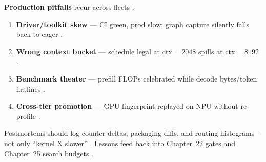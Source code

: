 \textbf{Production pitfalls} recur across fleets \citep{patel2025llminference,memoryfloor2026,taxbreak2026,yirage2026,chen2020compilerbasedhardw,dlbook,kwon2023vllm,liu2024deepseekv3,amd2024aie,semianalysis2024tma,amd2024xdna,dao2022flashattention,dao2023flashdecoding,nvidia2024cudagraphs,nvidia2022hopper}:
\begin{enumerate}
\item \textbf{Driver/toolkit skew} --- CI green, prod slow; graph capture silently falls back to eager \citep{nvidia2024cudagraphs,memoryfloor2026,kwon2023vllm,yirage2026,chen2020compilerbasedhardw,patel2025llminference,taxbreak2026,liu2024deepseekv3,amd2024aie,dlbook,semianalysis2024tma,amd2024xdna,dao2022flashattention,dao2023flashdecoding,nvidia2024cudagraphs,nvidia2022hopper}.
\item \textbf{Wrong context bucket} --- schedule legal at ctx${=}2048$ spills at ctx${=}8192$ \citep{memoryfloor2026,dao2022flashattention,kwon2023vllm,yirage2026,chen2020compilerbasedhardw,patel2025llminference,taxbreak2026,liu2024deepseekv3,amd2024aie,dlbook,dao2023flashdecoding,nvidia2024cudagraphs,nvidia2022hopper,semianalysis2024tma,amd2024xdna}.
\item \textbf{Benchmark theater} --- prefill FLOPs celebrated while decode bytes/token flatlines \citep{patel2025llminference,taxbreak2026,memoryfloor2026,yirage2026,chen2020compilerbasedhardw,kwon2023vllm,liu2024deepseekv3,amd2024aie,dlbook,dao2022flashattention,dao2023flashdecoding,nvidia2024cudagraphs,nvidia2022hopper,semianalysis2024tma,amd2024xdna}.
\item \textbf{Cross-tier promotion} --- GPU fingerprint replayed on NPU without re-profile \citep{amd2024xdna,amd2024aie,yirage2026,chen2020compilerbasedhardw,patel2025llminference,kwon2023vllm,liu2024deepseekv3,memoryfloor2026,taxbreak2026,dlbook,semianalysis2024tma,dao2022flashattention,dao2023flashdecoding,nvidia2024cudagraphs,nvidia2022hopper}.
\end{enumerate}

Postmortems should log counter deltas, packaging diffs, and routing histograms---not only ``kernel X slower'' \citep{patel2025llminference,liu2024deepseekv3,yirage2026,chen2020compilerbasedhardw,kwon2023vllm,memoryfloor2026,taxbreak2026,amd2024aie,dlbook,semianalysis2024tma,amd2024xdna,dao2022flashattention,dao2023flashdecoding,nvidia2024cudagraphs,nvidia2022hopper}. Lessons feed back into Chapter~22 gates and Chapter~25 search budgets \citep{chen2020compilerbasedhardw,yirage2026,patel2025llminference,memoryfloor2026,taxbreak2026,kwon2023vllm,liu2024deepseekv3,amd2024aie,dlbook,semianalysis2024tma,amd2024xdna,dao2022flashattention,dao2023flashdecoding,nvidia2024cudagraphs,nvidia2022hopper}.

